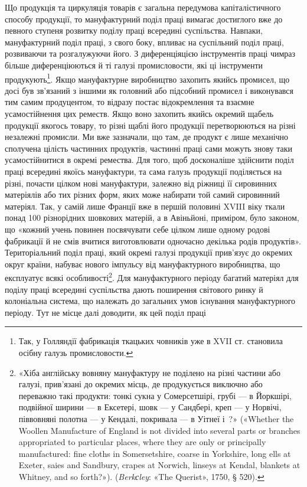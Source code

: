 Що продукція та циркуляція товарів є загальна передумова
капіталістичного способу продукції, то мануфактурний поділ
праці вимагає достиглого вже до певного ступеня розвитку поділу
праці всередині суспільства. Навпаки, мануфактурний поділ
праці, з свого боку, впливає на суспільний поділ праці, розвиваючи
та розгалужуючи його. З диференціяцією інструментів
праці чимраз більше диференціюються й ті галузі промисловости,
які ці інструменти продукують\footnote{
Так, у Голляндії фабрикація ткацьких човників уже в XVII ст.
становила осібну галузь промисловости.
}. Якщо мануфактурне виробництво
захопить якийсь промисел, що досі був зв’язаний з іншими
як головний або підсобний промисел і виконувався тим самим
продуцентом, то відразу постає відокремлення та взаємне усамостійнення
цих реместв. Якщо воно захопить якийсь окремий
щабель продукції якогось товару, то різні щаблі його продукції
перетворюються на різні незалежні промисли. Ми вже зазначали,
що там, де продукт є лише механічно сполучена цілість частинних
продуктів, частинні праці сами можуть знову таки усамостійнитися
в окремі ремества. Для того, щоб досконаліше здійснити
поділ праці всередині якоїсь мануфактури, та сама галузь
продукції поділяється на різні, почасти цілком нові мануфактури,
залежно від ріжниці її сировинних матеріялів або тих різних
форм, яких може набирати той самий сировинний матеріял.
Так, у самій лише Франції вже в першій половині XVIII віку
ткали понад 100 різнорідних шовкових матерій, а в Авіньйоні,
приміром, було законом, що «кожний учень повинен посвячувати
себе цілком лише одному родові фабрикації й не смів вчитися
виготовлювати одночасно декілька родів продуктів». Територіальний
поділ праці, який окремі галузі продукції прив’язує
до окремих округ країни, набуває нового імпульсу від мануфактурного
виробництва, що експлуатує всякі особливості\footnote{
«Хіба англійську вовняну мануфактуру не поділено на різні
частини або галузі, прив’язані до окремих місць, де продукується виключно
або переважно такі продукти: тонкі сукна у Сомерсетшірі, грубі —
в Йоркшірі, подвійної ширини — в Ексетері, шовк — у Сандбері, креп —
у Норвічі, піввовняні полотна — у Кендалі, покривала — в Уітнеї і~?» («Whether the Woollen Manufacture of England is not divided
into several parts or branches appropriated to particular places, where
they are only or principally manufactured: fine cloths in Somersetshire,
coarse in Yorkshire, long ells at Exeter, saies and Sandbury, crapes at
Norwich, linseys at Kendal, blankets at Whitney, and so forth?»).
(\emph{Berkсley}: «The Querist», 1750, § 520).
}. Для мануфактурного
періоду багатий матеріял для поділу праці всередині
суспільства дають поширення світового ринку й колоніальна
система, що належать до загальних умов існування мануфактурного
періоду. Тут не місце далі доводити, як цей поділ праці
\parbreak{}  %
